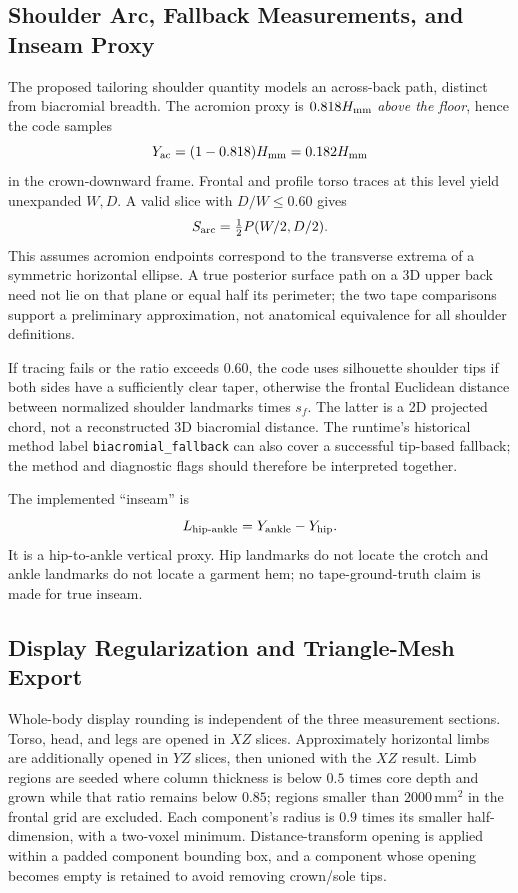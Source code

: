 \subsection{Shoulder Arc, Fallback Measurements, and Inseam Proxy}
\label{subsec:shoulder_arc}
The proposed tailoring shoulder quantity models an across-back path, distinct from biacromial breadth. The acromion proxy is $0.818H_{\rm mm}$ \emph{above the floor}, hence the code samples
\begin{equation}
Y_{\rm ac}=(1-0.818)H_{\rm mm}=0.182H_{\rm mm}
\end{equation}
in the crown-downward frame. Frontal and profile torso traces at this level yield unexpanded $W,D$. A valid slice with $D/W\le0.60$ gives
\begin{equation}
S_{\rm arc}=\tfrac12P(W/2,D/2).
\label{eq:shoulder_arc}
\end{equation}
This assumes acromion endpoints correspond to the transverse extrema of a symmetric horizontal ellipse. A true posterior surface path on a 3D upper back need not lie on that plane or equal half its perimeter; the two tape comparisons support a preliminary approximation, not anatomical equivalence for all shoulder definitions.

If tracing fails or the ratio exceeds $0.60$, the code uses silhouette shoulder tips if both sides have a sufficiently clear taper, otherwise the frontal Euclidean distance between normalized shoulder landmarks times $s_f$. The latter is a 2D projected chord, not a reconstructed 3D biacromial distance. The runtime's historical method label \texttt{biacromial\_fallback} can also cover a successful tip-based fallback; the method and diagnostic flags should therefore be interpreted together.

\label{subsec:linear_measurements}
The implemented ``inseam'' is
\begin{equation}
L_{\rm hip\text{-}ankle}=Y_{\rm ankle}-Y_{\rm hip}.
\end{equation}
It is a hip-to-ankle vertical proxy. Hip landmarks do not locate the crotch and ankle landmarks do not locate a garment hem; no tape-ground-truth claim is made for true inseam.

\subsection{Display Regularization and Triangle-Mesh Export}
\label{subsec:mesh_export}
Whole-body display rounding is independent of the three measurement sections. Torso, head, and legs are opened in $XZ$ slices. Approximately horizontal limbs are additionally opened in $YZ$ slices, then unioned with the $XZ$ result. Limb regions are seeded where column thickness is below $0.5$ times core depth and grown while that ratio remains below $0.85$; regions smaller than $2000$\,mm$^2$ in the frontal grid are excluded. Each component's radius is $0.9$ times its smaller half-dimension, with a two-voxel minimum. Distance-transform opening is applied within a padded component bounding box, and a component whose opening becomes empty is retained to avoid removing crown/sole tips.

